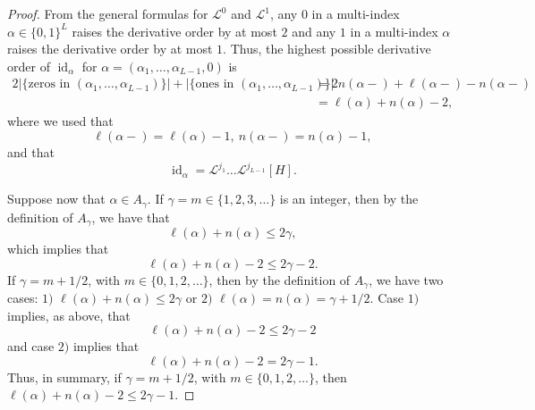 \documentclass[11pt]{amsart}
\newcommand{\Lo}{\mathcal{L}^{0}}
\newcommand{\Li}{\mathcal{L}^{1}}
\newcommand{\LL}{\mathcal{L}}
\newcommand{\id}{\operatorname{id}}
\begin{document}
{\begin{proof}
From the general formulas for $\Lo$ and $\Li$, any $0$ in a multi-index $\alpha \in \{ 0,1 \}^{L}$ raises the derivative order by at most $2$ and any $1$ in a multi-index $\alpha$ raises the derivative order by at most $1$. Thus, the highest possible derivative order of $\id_{\alpha}$ for $\alpha = (\alpha_{1},\ldots,\alpha_{L-1},0)$ is
\begin{align*}
2 \left| \{ \text{zeros in } (\alpha_{1},\ldots,\alpha_{L-1}) \} \right| + \left| \{ \text{ones in } (\alpha_{1},\ldots,\alpha_{L-1}) \} \right| &= 2 n (\alpha -) + \ell(\alpha-) - n(\alpha-) \\ &= \ell(\alpha) + n(\alpha) - 2,
\end{align*}
where we used that
\begin{equation*}
\ell(\alpha-)= \ell(\alpha)-1,\ n(\alpha-) = n(\alpha)-1,
\end{equation*}
and that
\begin{equation*}
\id_{\alpha} = \LL^{j_{1}} \ldots \LL^{j_{L-1}} [H].
\end{equation*}

Suppose now that $\alpha \in A_{\gamma}$. If $\gamma = m \in \{1,2,3,\ldots \}$ is an integer, then by the definition of $A_{\gamma}$, we have that
\begin{equation*}
\ell(\alpha) + n(\alpha) \leq 2 \gamma,
\end{equation*}
which implies that
\begin{equation*}
\ell(\alpha) + n(\alpha) - 2 \leq 2 \gamma -2.
\end{equation*}
If $\gamma = m + 1/2$, with $m \in \{0,1,2,\ldots \}$, then by the definition of $A_{\gamma}$, we have two cases: $1)$ $\ell(\alpha) + n(\alpha) \leq 2 \gamma$ or $2)$ $\ell(\alpha) = n(\alpha) = \gamma + 1/2$. Case $1)$ implies, as above, that
\begin{equation*}
\ell(\alpha) + n(\alpha) - 2 \leq 2 \gamma -2
\end{equation*}
and case $2)$ implies that
\begin{equation*}
\ell(\alpha) + n(\alpha) -2 = 2 \gamma -1.
\end{equation*}
Thus, in summary, if $\gamma = m + 1/2$, with $m \in \{ 0,1,2,\ldots \}$, then $\ell(\alpha) + n(\alpha) - 2 \leq 2 \gamma - 1$.


\end{proof}}
\end{document}
